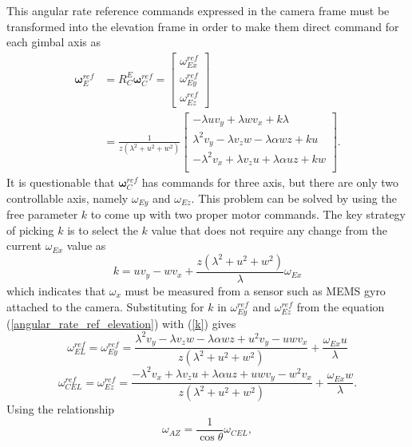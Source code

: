 This angular rate reference commands expressed in the camera frame must be transformed into the elevation frame in order to make them direct command for each gimbal axis as
\begin{align}
\mathbf{\omega}_E^{ref}&=R_C^E\mathbf{\omega}_C^{ref}
=\begin{bmatrix}
\omega_{Ex}^{ref} \\ \omega_{Ey}^{ref} \\ \omega_{Ez}^{ref}
\end{bmatrix}
\\&=\frac{1}{z(\lambda^2+u^2+w^2)}\begin{bmatrix}
-\lambda u v_y+\lambda w v_x +k\lambda \\
\lambda^2 v_y-\lambda v_z w -\lambda \alpha wz+ku \\
-\lambda^2 v_x+\lambda v_zu +\lambda \alpha uz+kw \\
\end{bmatrix}.
\label{angular_rate_ref_elevation}
\end{align}
It is questionable that $\mathbf{\omega}_C^{ref}$ has commands for three axis, but there are only two controllable axis, namely $\omega_{Ey}$ and $\omega_{Ez}$. This problem can be solved by using the free parameter $k$ to come up with two proper motor commands. The key strategy of picking $k$ is to select the $k$ value that does not require any change from the current $\omega_{Ex}$ value as 
\begin{equation}
k=uv_y-wv_x+\frac{z(\lambda^2+u^2+w^2)}{\lambda}\omega_{Ex}
\label{k}
\end{equation}
which indicates that $\omega_x$ must be measured from a sensor such as MEMS gyro attached to the camera. Substituting for $k$ in $\omega_{Ey}^{ref}$ and $\omega_{Ez}^{ref}$ from the equation (\ref{angular_rate_ref_elevation}) with (\ref{k}) gives
\begin{equation}
\omega_{EL}^{ref}=\omega_{Ey}^{ref}=\frac{\lambda^2 v_y-\lambda v_z w -\lambda \alpha wz+u^2 v_y-uwv_x}{z(\lambda^2+u^2+w^2)}+\frac{\omega_{Ex}u}{\lambda}
\end{equation}
\begin{equation}
\omega_{CEL}^{ref}=\omega_{Ez}^{ref}=\frac{-\lambda^2 v_x+\lambda v_z u+\lambda \alpha uz +uwv_y -w^2 v_x}{z(\lambda^2+u^2+w^2)}+\frac{\omega_{Ex}w}{\lambda}.
\end{equation}
Using the relationship 
\begin{equation}
\omega_{AZ}=\frac{1}{\cos\theta}\omega_{CEL},
\end{equation}
